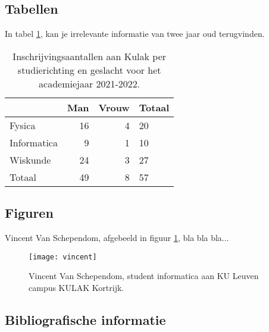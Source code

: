 \documentclass{article}
\begin{document}
	\subsection{Tabellen}
	
	In tabel \ref{tabel:inschrijvingen}, kan je irrelevante informatie van twee jaar oud terugvinden.
	
	\begin{table}
		\centering
			\begin{tabular}{l | r r | l}
			& Man & Vrouw & Totaal  \\ \hline
			Fysica      & 16  & 4     & 20 \\
			Informatica & 9   & 1     & 10 \\
			Wiskunde    & 24  & 3     & 27 \\ \hline
			Totaal      & 49  & 8     & 57
		\end{tabular}
		\caption{Inschrijvingsaantallen aan Kulak per studierichting en geslacht voor het academiejaar 2021-2022.}
		\label{tabel:inschrijvingen}
	\end{table}
	
	\subsection{Figuren}
	
	Vincent Van Schependom, afgebeeld in figuur \ref{fig:vincent}, bla bla bla...
	
	\begin{figure}
	\centering
	\texttt{[image: vincent]}
	\caption{Vincent Van Schependom, student informatica aan KU Leuven campus KULAK Kortrijk.}
	\label{fig:vincent}
	\end{figure}
	
	\subsection{Bibliografische informatie}
	
\end{document}
